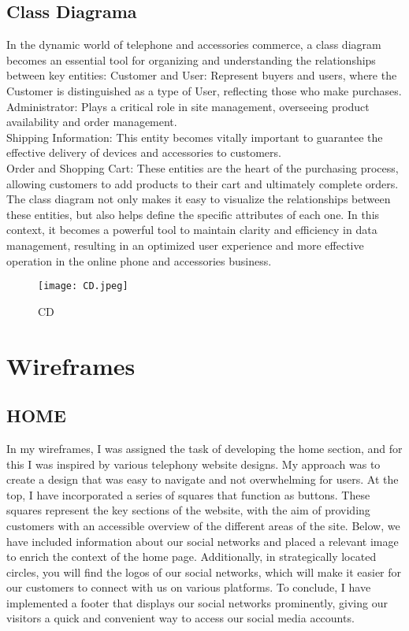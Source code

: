 \documentclass[journal]{IEEEtran}
\begin{document}
\subsection{Class Diagrama}

In the dynamic world of telephone and accessories commerce, a class diagram becomes an essential tool for organizing and understanding the relationships between key entities:
Customer and User: Represent buyers and users, where the Customer is distinguished as a type of User, reflecting those who make purchases.\\
Administrator: Plays a critical role in site management, overseeing product availability and order management.\\
Shipping Information: This entity becomes vitally important to guarantee the effective delivery of devices and accessories to customers.\\
Order and Shopping Cart: These entities are the heart of the purchasing process, allowing customers to add products to their cart and ultimately complete orders.\\
The class diagram not only makes it easy to visualize the relationships between these entities, but also helps define the specific attributes of each one. In this context, it becomes a powerful tool to maintain clarity and efficiency in data management, resulting in an optimized user experience and more effective operation in the online phone and accessories business.

\begin{figure}[h]
    \centering
 \texttt{[image: CD.jpeg]}
    \caption{CD}
    \label{fig:ejemplo}
\end{figure}

\section{Wireframes}

\subsection{HOME}

In my wireframes, I was assigned the task of developing the home section, and for this I was inspired by various telephony website designs. My approach was to create a design that was easy to navigate and not overwhelming for users. At the top, I have incorporated a series of squares that function as buttons. These squares represent the key sections of the website, with the aim of providing customers with an accessible overview of the different areas of the site. Below, we have included information about our social networks and placed a relevant image to enrich the context of the home page. Additionally, in strategically located circles, you will find the logos of our social networks, which will make it easier for our customers to connect with us on various platforms. To conclude, I have implemented a footer that displays our social networks prominently, giving our visitors a quick and convenient way to access our social media accounts.
\end{document}
